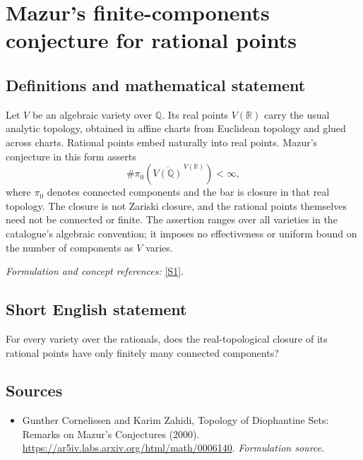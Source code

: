 \documentclass[11pt]{article}
\begin{document}
\section*{\texorpdfstring{Mazur's finite-components conjecture for rational points}{Mazur's finite-components conjecture for rational points}}\label{statement}
\subsection{Definitions and mathematical statement}
Let $V$ be an algebraic variety over ${\mathbb{Q}}$. Its real points $V({\mathbb{R}})$ carry the usual analytic topology, obtained in affine charts from Euclidean topology and glued across charts. Rational points embed naturally into real points. Mazur's conjecture in this form asserts
\[
 \#\pi_0\!\left(\overline{V({\mathbb{Q}})}^{\,V({\mathbb{R}})}\right)<\infty,
\]
where $\pi_0$ denotes connected components and the bar is closure in that real topology. The closure is not Zariski closure, and the rational points themselves need not be connected or finite. The assertion ranges over all varieties in the catalogue's algebraic convention; it imposes no effectiveness or uniform bound on the number of components as $V$ varies.
\par\smallskip\textit{Formulation and concept references:} \href{https://ar5iv.labs.arxiv.org/html/math/0006140}{[S1]}.

\subsection{Short English statement}
For every variety over the rationals, does the real-topological closure of its rational points have only finitely many connected components?
\subsection{Sources}
\begin{itemize}
\item[S1]Gunther Cornelissen and Karim Zahidi, Topology of Diophantine Sets: Remarks on Mazur's Conjectures (2000).
\url{https://ar5iv.labs.arxiv.org/html/math/0006140}.
\textit{Formulation source.}
\end{itemize}
\end{document}
